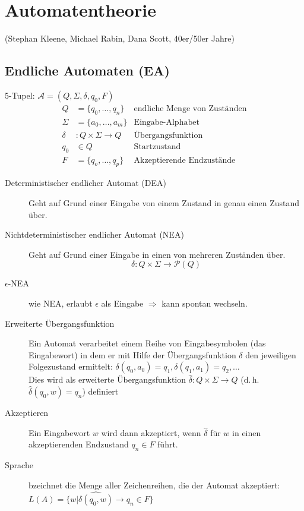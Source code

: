\columnbreak
\section{Automatentheorie}
(Stephan Kleene, Michael Rabin, Dana Scott, 40er/50er Jahre)

\subsection{Endliche Automaten (EA)}
5-Tupel: $\mathcal{A} = (Q, \Sigma, \delta, q_0, F)$
\begin{align*}
	Q &= \{q_0, \dots, q_n\} & \mbox{endliche Menge von Zuständen}\\
	\Sigma &= \{a_0, \dots, a_m\} & \mbox{Eingabe-Alphabet}\\
	\delta &: Q \times \Sigma \rightarrow Q & \mbox{Übergangsfunktion}\\
	q_0 &\in Q & \mbox {Startzustand}\\
	F &= \{q_o, \dots, q_p\} & \mbox{Akzeptierende Endzustände}
\end{align*}
\begin{description}
	\item [Deterministischer endlicher Automat (DEA)]
	Geht auf Grund einer Eingabe von einem Zustand in genau einen Zustand über.
	\item [Nichtdeterministischer endlicher Automat (NEA)]
	Geht auf Grund einer Eingabe in einen von mehreren Zuständen über.
	\begin{equation*}
		\delta: Q \times \Sigma \rightarrow \mathcal{P}(Q) 
	\end{equation*}
	\item[$\epsilon$-NEA] wie NEA, erlaubt $\epsilon$ als Eingabe $\Rightarrow$ kann spontan wechseln.
	\item [Erweiterte Übergangsfunktion] 
	Ein Automat verarbeitet einem Reihe von Eingabesymbolen (das Eingabewort) in dem er mit Hilfe der Übergangsfunktion $\delta$ den jeweiligen Folgezustand ermittelt: $\delta(q_0, a_0)= q_1, \delta(q_1, a_1) = q_2, \dots$\\
	Dies wird als erweiterte Übergangsfunktion $\hat{\delta}: Q \times \Sigma \rightarrow Q$ (d.\,h. $\hat{\delta}(q_0, w) = q_n$) definiert
	
	\item[Akzeptieren] 
	Ein Eingabewort $w$ wird dann akzeptiert, wenn $\hat{\delta}$ für $w$ in einen akzeptierenden Endzustand $q_n \in F$ führt.

	\item[Sprache]
	bzeichnet die Menge aller Zeichenreihen, die der Automat akzeptiert:
		$L(A) = \{w | \hat{\delta(q_0, w)} \rightarrow q_n \in F\}$
\end{description}

